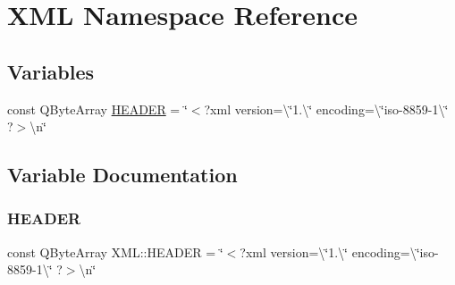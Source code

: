 \hypertarget{namespace_x_m_l}{}\section{X\+ML Namespace Reference}
\label{namespace_x_m_l}
\subsection*{Variables}
\begin{DoxyCompactItemize}
\item 
const Q\+Byte\+Array \hyperlink{namespace_x_m_l_a98d2c9e274e4c05c1b75897d7fe6fcd3}{H\+E\+A\+D\+ER} = \char`\"{}$<$?xml version=\textbackslash{}\char`\"{}1.\textbackslash{}\char`\"{} encoding=\textbackslash{}\char`\"{}iso-\/8859-\/1\textbackslash{}\char`\"{} ?$>$\textbackslash{}n\char`\"{}
\end{DoxyCompactItemize}


\subsection{Variable Documentation}
\mbox{\label{namespace_x_m_l_a98d2c9e274e4c05c1b75897d7fe6fcd3}} 
\subsubsection{\texorpdfstring{H\+E\+A\+D\+ER}{HEADER}}
{\footnotesize\ttfamily const Q\+Byte\+Array X\+M\+L\+::\+H\+E\+A\+D\+ER = \char`\"{}$<$?xml version=\textbackslash{}\char`\"{}1.\textbackslash{}\char`\"{} encoding=\textbackslash{}\char`\"{}iso-\/8859-\/1\textbackslash{}\char`\"{} ?$>$\textbackslash{}n\char`\"{}}

